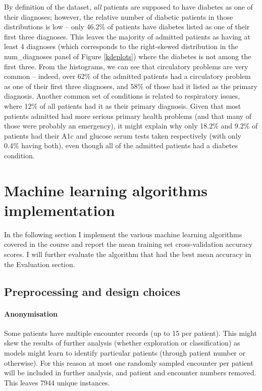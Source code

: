 \documentclass[10pt, twocolumn]{article}
\begin{document}
By definition of the dataset, \textit{all} patients are supposed to have diabetes as one of their diagnoses; however, the relative number of diabetic patients in those distributions is low -- only 46.2\% of patients have diabetes listed as one of their first three diagnoses. This leaves the majority of admitted patients as having at least 4 diagnoses (which corresponds to the right-skewed distribution in the num\_diagnoses panel of Figure \ref{kdeplots}) where the diabetes is not among the first three. From the histograms, we can see that circulatory problems are very common -- indeed, over 62\% of the admitted patients had a circulatory problem as one of their first three diagnoses, and 58\% of those had it listed as the primary diagnosis. Another common set of conditions is related to respiratory issues, where 12\% of all patients had it as their primary diagnosis. Given that most patients admitted had more serious primary health problems (and that many of those were probably an emergency), it might explain why only 18.2\% and 9.2\% of patients had their A1c and glucose serum tests taken respectively (with only 0.4\% having both), even though all of the admitted patients had a diabetes condition.


\section{Machine learning algorithms implementation}

In the following section I implement the various machine learning algorithms covered in the course and report the mean training set cross-validation accuracy scores. I will further evaluate the algorithm that had the best mean accuracy in the Evaluation section.

\subsection{Preprocessing and design choices}

\paragraph{Anonymisation} Some patients have multiple encounter records (up to 15 per patient). This might skew the results of further analysis (whether exploration or classification) as models might learn to identify particular patients (through patient number or otherwise). For this reason at most one randomly sampled encounter per patient will be included in further analysis, and patient and encounter numbers removed. This leaves 7944 unique instances.
\end{document}
